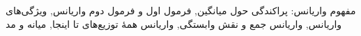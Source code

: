 \documentclass[a4paper,11pt,oneside,openany]{book}
\begin{document}
  {{مفهوم واریانس: پراکندگی حول میانگین},
   {فرمول اول و فرمول دوم واریانس},
   {ویژگی‌های واریانس},
   {واریانس جمع و نقش وابستگی},
   {واریانس همهٔ توزیع‌های تا اینجا},
   {میانه و مد}}

\mainmatter
\setcounter{chapter}{11}   %

\end{document}
